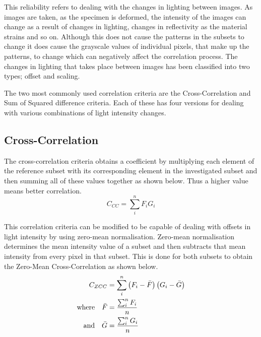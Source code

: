 \documentclass[[12pt,oneside,openany,a4paper, %
\newcommand*\mean[1]{\bar{#1}} %
\begin{document}
This reliability refers to dealing with the changes in lighting between images. As images are taken, as the specimen is deformed, the intensity of the images can change as a result of changes in lighting, changes in reflectivity as the material strains and so on. Although this does not cause the patterns in the subsets to change it does cause the grayscale values of individual pixels, that make up the patterns, to change which can negatively affect the correlation process. The changes in lighting that takes place between images has been classified into two types; offset and scaling. 



The two most commonly used correlation criteria are the Cross-Correlation and Sum of Squared difference criteria. Each of these has four versions for dealing with various combinations of light intensity changes.

\subsection{Cross-Correlation}
The cross-correlation criteria obtains a coefficient by multiplying each element of the reference subset with its corresponding element in the investigated subset and then summing all of these values together as shown below. Thus a higher value means better correlation.
\begin{equation}
  C_{CC} = \sum_{i}^n F_i G_i
\end{equation}

This correlation criteria can be modified to be capable of dealing with offsets in light intensity by using zero-mean normalisation. Zero-mean normalisation determines the mean intensity value of a subset and then subtracts that mean intensity from every pixel in that subset. This is done for both subsets to obtain the Zero-Mean Cross-Correlation as shown below.
\begin{align}
  C_{ZCC} &= \sum_i^n \left( F_i - \mean{F} \right) \left( G_i - \mean{G} \right) \\
  \text{where} \quad \mean{F} &= \frac{\sum_{i}^{n} F_{i}}{n} \\
   \text{and} \quad \mean{G} &=\frac{\sum_{i}^{n} G_{i}}{n}
\end{align}
\end{document}
